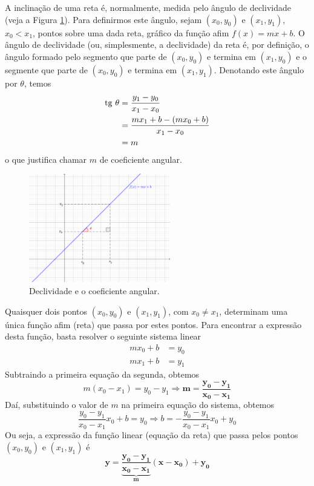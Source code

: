 \documentclass[../main.tex]{subfiles}
\begin{document}
A inclinação de uma reta é, normalmente, medida pelo ângulo de declividade (veja a Figura \ref{fig:declividade}). Para definirmos este ângulo, sejam $(x_0, y_0)$ e $(x_1, y_1)$, $x_0<x_1$, pontos sobre uma dada reta, gráfico da função afim $f(x)=mx+b$. O ângulo de declividade (ou, simplesmente, a declividade) da reta é, por definição, o ângulo formado pelo segmento que parte de $(x_0, y_0)$ e termina em $(x_1, y_0)$ e o segmente que parte de $(x_0, y_0)$ e termina em $(x_1, y_1)$. Denotando este ângulo por $\theta$, temos
\begin{align*}
  \operatorname{tg}\,\theta &= \frac{y_1-y_0}{x_1-x_0}\\
            &= \frac{mx_1+b-(mx_0+b)}{x_1-x_0}\\
            &= m
\end{align*}
o que justifica chamar $m$ de coeficiente angular.
\begin{figure}[H]
  \centering
  \includegraphics[width=0.55\textwidth]{fig_func/fig_declividade}
  \caption{Declividade e o coeficiente angular.}
  \label{fig:declividade}
\end{figure}

Quaisquer dois pontos $(x_0, y_0)$ e $(x_1, y_1)$, com $x_0\neq x_1$, determinam uma única função afim (reta) que passa por estes pontos. Para encontrar a expressão desta função, basta resolver o seguinte sistema linear
\begin{align*}
  mx_0 + b &= y_0\\
  mx_1 + b &= y_1
\end{align*}
Subtraindo a primeira equação da segunda, obtemos
\begin{equation}
  m(x_0-x_1) = y_0-y_1 \Rightarrow \boldsymbol{m = \frac{y_0-y_1}{x_0-x_1}}
\end{equation}
Daí, substituindo o valor de $m$ na primeira equação do sistema, obtemos
\begin{equation*}
  \frac{y_0-y_1}{x_0-x_1}x_0 + b = y_0 \Rightarrow b = -\frac{y_0-y_1}{x_0-x_1}x_0 + y_0
\end{equation*}
Ou seja, a expressão da função linear (equação da reta) que passa pelos pontos $(x_0, y_0)$ e $(x_1, y_1)$ é
\begin{equation}\label{eq:funafim_eq}
 \boldsymbol{ y = \underbrace{\frac{y_0-y_1}{x_0-x_1}}_{m}(x-x_0) + y_0}
\end{equation}
\end{document}
